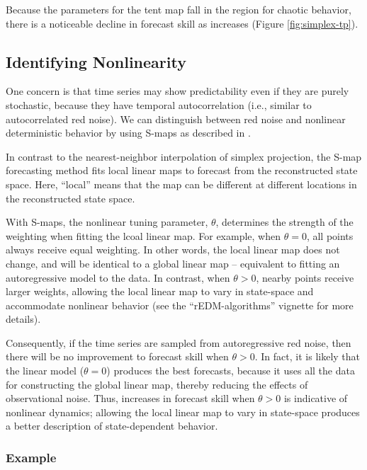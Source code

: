 \documentclass[article]{jss}
\begin{document}
Because the parameters for the tent map fall in the region for chaotic behavior, there is a noticeable decline in forecast skill as  increases (Figure \ref{fig:simplex-tp}).

\subsection{Identifying Nonlinearity}\label{sec:nonlinearity}

One concern is that time series may show predictability even if they are purely stochastic, because they have temporal autocorrelation (i.e., similar to autocorrelated red noise). We can distinguish between red noise and nonlinear deterministic behavior by using S-maps as described in \citet{Sugihara_1994}.

In contrast to the nearest-neighbor interpolation of simplex projection, the S-map forecasting method \citep{Sugihara_1994} fits local linear maps to forecast from the reconstructed state space. Here, ``local'' means that the map can be different at different locations in the reconstructed state space.

With S-maps, the nonlinear tuning parameter, $\theta$, determines the strength of the weighting when fitting the lcoal linear map. For example, when $\theta = 0$, all points always receive equal weighting. In other words, the local linear map does not change, and will be identical to a global linear map -- equivalent to fitting an autoregressive model to the data. In contrast, when $\theta > 0$, nearby points receive larger weights, allowing the local linear map to vary in state-space and accommodate nonlinear behavior (see the ``rEDM-algorithms'' vignette for more details).

Consequently, if the time series are sampled from autoregressive red noise, then there will be no improvement to forecast skill when $\theta > 0$. In fact, it is likely that the linear model ($\theta = 0$) produces the best forecasts, because it uses all the data for constructing the global linear map, thereby reducing the effects of observational noise. Thus, increases in forecast skill when $\theta > 0$ is indicative of nonlinear dynamics; allowing the local linear map to vary in state-space produces a better description of state-dependent behavior.

\subsubsection{Example}\label{nonlinearity-example}
\end{document}
